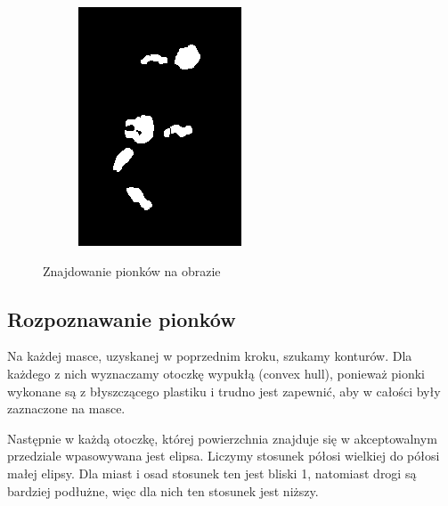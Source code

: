 \documentclass[a4paper]{article}
\begin{document}
\begin{figure}[H]
\begin{subfigure}[t]{0.3\linewidth}
            \includegraphics[width=\linewidth]{pictures/steps/pawns_mask_dilated.png}
        \end{subfigure}
        \caption{Znajdowanie pionków na obrazie}
    \end{figure}


    \subsection{Rozpoznawanie pionków}
    Na każdej masce, uzyskanej w poprzednim kroku, szukamy konturów. Dla każdego z nich wyznaczamy otoczkę wypukłą (convex hull), ponieważ pionki wykonane są z błyszczącego plastiku i trudno jest zapewnić, aby w całości były zaznaczone na masce.

    Następnie w każdą otoczkę, której powierzchnia znajduje się w akceptowalnym przedziale wpasowywana jest elipsa.
    Liczymy stosunek półosi wielkiej do półosi małej elipsy. Dla miast i osad stosunek ten jest bliski 1, natomiast drogi są bardziej podłużne, więc dla nich ten stosunek jest niższy.
\end{document}
